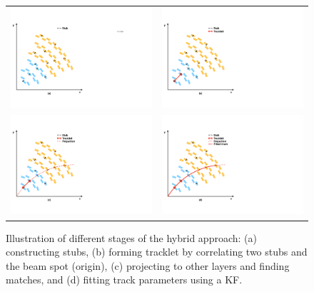 \begin{figure}[tbh!]
 \begin{center}
 \begin{tabular}{cc}
  \includegraphics[width=.45\linewidth]{figures/Part2/Upgrade/tracklet1} &
  \includegraphics[width=.45\linewidth]{figures/Part2/Upgrade/tracklet2} \\
  \includegraphics[width=.45\linewidth]{figures/Part2/Upgrade/tracklet3} &
  \includegraphics[width=.45\linewidth]{figures/Part2/Upgrade/tracklet4} \\
 \end{tabular}
 \caption{Illustration of different stages of the hybrid approach: (a) constructing stubs, (b) forming tracklet by correlating two stubs and the beam spot (origin), (c) projecting to other layers and finding matches, and (d) fitting track parameters using a \ac{KF}.}
 \label{fig:algorithm}
 \end{center}
\end{figure}

